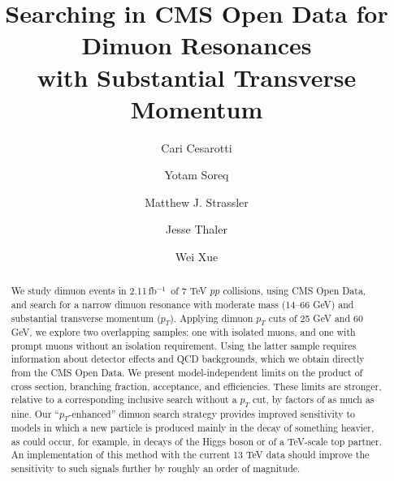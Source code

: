 \documentclass[aps,prd,twocolumn,superscriptaddress,preprintnumbers,nofootinbib,longbibliography,floatfix]{revtex4-1}
\newcommand{\inv}{$^{-1}$}
\begin{document}
\title{Searching in CMS Open Data for Dimuon Resonances \\ with Substantial Transverse Momentum}

\author{Cari Cesarotti}

\author{Yotam Soreq}


\author{Matthew J. Strassler}

\author{Jesse Thaler}

\author{Wei Xue}



\begin{abstract}
%
We study dimuon events in 2.11\,fb\inv\ of 7 TeV $pp$ collisions, using CMS Open Data, and search for a narrow dimuon resonance with moderate mass (14--66 GeV) and substantial transverse momentum ($p_T$).
% 
Applying dimuon $p_T$ cuts of 25 GeV and 60 GeV, we explore two overlapping samples: 
one with isolated muons, and one with prompt muons without an isolation requirement.
%
Using the latter sample requires information about detector effects and QCD backgrounds, which we obtain directly from the CMS Open Data.
%
We present model-independent  limits on the product of cross section, branching fraction, acceptance, and efficiencies.
%
These limits are stronger, relative to a corresponding inclusive search without a $p_T$ cut, by factors of as much as nine.
%
Our ``$p_T$-enhanced''  dimuon search strategy provides improved sensitivity to models in which a new particle is produced mainly in the decay of something heavier, as could occur, for example, in decays of the Higgs boson or of a TeV-scale top partner.
%
An implementation of this method with the current 13 TeV data should improve the sensitivity to such signals further by roughly an order of magnitude.
%
\end{abstract}
\end{document}
